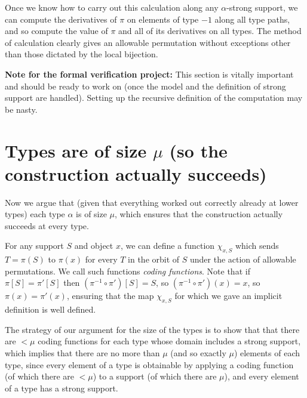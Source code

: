 \begin{description}
Once we know how to carry out this calculation along any $\alpha$-strong support, we can compute the derivatives of $\pi$ on elements of type $-1$  along all type paths, and so compute the value of $\pi$ and all of its derivatives on all types.  The method of calculation clearly gives an allowable permutation without exceptions other than those dictated by the local bijection.

\end{description}
{\bf Note for the formal verification project:}  This section is vitally important and should be ready to work on (once the model and the definition of strong support are handled).  Setting up the recursive definition of the computation may be nasty.

\newpage
\section{Types are of size \texorpdfstring{$\mu$}{μ} (so the construction actually succeeds)}

Now we argue that (given that everything worked out correctly already at lower types) each type $\alpha$ is of size $\mu$, which ensures
that the construction actually succeeds at every type.



For any support $S$ and object $x$, we can define a function $\chi_{x,S}$ which sends $T=\pi(S)$ to $\pi(x)$ for every $T$ in the orbit of $S$ under
the action of allowable permutations.  We call such functions {\em coding functions\/}.  Note that if $\pi[S]=\pi'[S]$ then $(\pi^{-1}\circ \pi')[S]= S$, so
$(\pi^{-1}\circ \pi')(x)= x$, so $\pi(x)=\pi'(x)$, ensuring that the map $\chi_{x,S}$ for which we gave an implicit definition is well defined.

The strategy of our argument for the size of the types is to show that that there are $<\mu$ coding functions for each type whose domain includes a strong support, which implies that there are no more than $\mu$ (and so exactly $\mu$) elements of each type, since every element of a type is obtainable by applying a coding function (of which there are $<\mu$) to a support (of which there are $\mu$), and every element of a type has a strong support.

